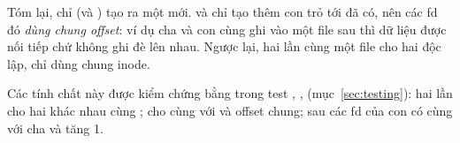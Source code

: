 Tóm lại, chỉ  (và ) tạo ra một  mới.
 và  chỉ tạo thêm con trỏ tới  đã có, nên
các fd đó \emph{dùng chung offset}: ví dụ cha và con cùng ghi vào một file sau
 thì dữ liệu được nối tiếp chứ không ghi đè lên nhau. Ngược lại, hai
lần  cùng một file cho hai  độc lập, chỉ dùng chung
inode.

Các tính chất này được kiểm chứng bằng  trong test
, , 
(mục~\ref{sec:testing}): hai lần  cho hai  khác nhau cùng
;  cho cùng  với  và offset chung;
sau  các fd của con có cùng  với cha và  tăng 1.
